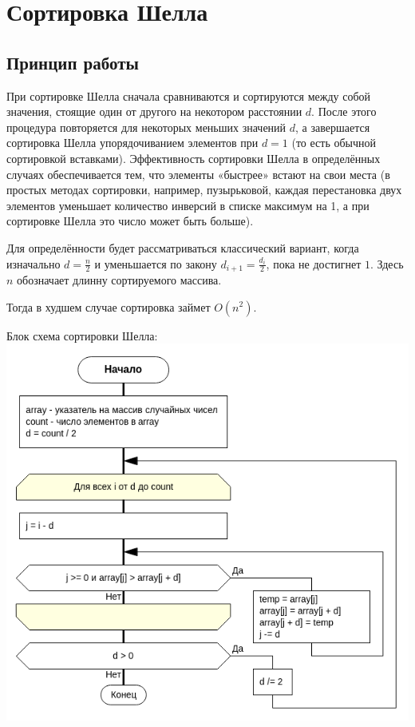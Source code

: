 \section{Сортировка Шелла}

\subsection{Принцип работы}

При сортировке Шелла сначала сравниваются и сортируются между собой значения, стоящие один от другого на некотором расстоянии $d$.
После этого процедура повторяется для некоторых меньших значений $d$, а завершается сортировка Шелла упорядочиванием элементов при $d = 1$ (то есть обычной сортировкой вставками).
Эффективность сортировки Шелла в определённых случаях обеспечивается тем, что элементы «быстрее» встают на свои места (в простых методах сортировки, например, пузырьковой, каждая перестановка двух элементов уменьшает количество инверсий в списке максимум на 1, а при сортировке Шелла это число может быть больше).

Для определённости будет рассматриваться классический вариант, когда изначально $d = \frac{n}{2}$ и уменьшается по закону $d_{i+1} = \frac{d_{i}}{2}$, пока не достигнет $1$. 
Здесь $n$ обозначает длинну сортируемого массива.

Тогда в худшем случае сортировка займет $O(n^2)$.

Блок схема сортировки Шелла:\\
\includegraphics[scale=0.6]{res/original.png}


